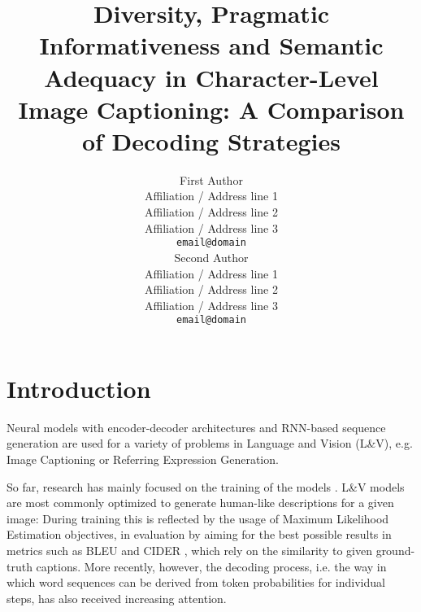 \documentclass[11pt,a4paper]{article}
\title{Diversity, Pragmatic Informativeness and Semantic Adequacy in Character-Level Image Captioning: A Comparison of Decoding Strategies}
\author{First Author \\
  Affiliation / Address line 1 \\
  Affiliation / Address line 2 \\
  Affiliation / Address line 3 \\
  \texttt{email@domain} \\\And
  Second Author \\
  Affiliation / Address line 1 \\
  Affiliation / Address line 2 \\
  Affiliation / Address line 3 \\
  \texttt{email@domain} \\}
\date{}
\begin{document}
\maketitle


\begin{abstract}
\end{abstract}


\section{Introduction}


Neural models with encoder-decoder architectures and RNN-based sequence generation are used for a variety of problems in Language and Vision (L\&V), e.g. Image Captioning or Referring Expression Generation. 

So far, research has mainly focused on the training of the models \citep{zarriess-schlangen-2018-decoding}.
L\&V models are most commonly optimized to generate human-like descriptions for a given image: During training this is reflected by the usage of Maximum Likelihood Estimation objectives, in evaluation by aiming for the best possible results in metrics such as BLEU \citep{papineni-etal-2002-bleu} and CIDER \citep{Vedantam2014}, which rely on the similarity to given ground-truth captions. 
More recently, however, the decoding process, i.e. the way in which word sequences can be derived from token probabilities for individual steps, has also received increasing attention.
\end{document}
